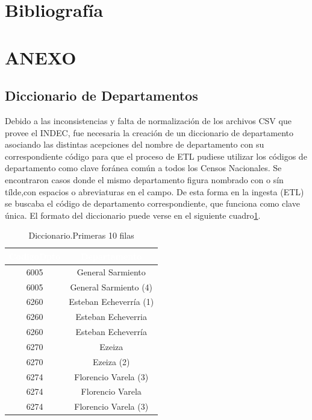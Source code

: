\documentclass{article}
\theoremstyle{mytheoremstyle}
\theoremstyle{mytheoremstyle}
\theoremstyle{myproblemstyle}
\begin{document}
\section{Bibliografía}
\printbibliography%

\section{ANEXO}
 \subsection{Diccionario de Departamentos } 
Debido a las inconsistencias y falta de normalización de los archivos CSV que provee el INDEC,
 fue necesaria la creación de un diccionario de departamento asociando las distintas acepciones del nombre de
  departamento con su correspondiente código para que el proceso de ETL pudiese utilizar los códigos de departamento 
  como clave foránea común a todos los Censos Nacionales.
  Se encontraron casos donde el mismo departamento figura nombrado con o sín  tílde,con espacios o abreviaturas en el campo. \newline
De esta forma en la ingesta (ETL) se buscaba el código de departamento correspondiente, que funciona como clave única.
 El formato del diccionario puede verse en el siguiente cuadro\ref{tab:diccionario}.
\begin{table}[htb]
  \centering
  \begin{tabular}{|c|c|}
  \hline
  \textbf{\cellcolor[rgb]{0,0.231,0.427}\textcolor{white}{CodigoDpto}} & \textbf{\cellcolor[rgb]{0,0.231,0.427}\textcolor{white}{Departamento}} \\ \hline
  6005 & General Sarmiento \\
  6005 & General Sarmiento (4) \\
  6260 & Esteban Echeverría (1) \\
  6260 & Esteban Echeverria \\
  6260 & Esteban Echeverría \\
  6270 & Ezeiza \\
  6270 & Ezeiza (2) \\
  6274 & Florencio Varela (3)  \\
  6274 & Florencio Varela \\
  6274 & Florencio Varela (3)  \\
  \hline
  \end{tabular}
  \caption{Diccionario.Primeras 10 filas}
  \label{tab:diccionario}
  \end{table}
\end{document}
